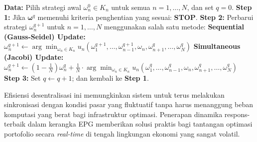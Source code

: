 \begin{algorithm}[htbp]
\caption{Iterative Best Response Algorithm \cite{jain_multi-portfolio_2012}}
\label{alg:best_response}
\begin{algorithmic}[1]
\State \textbf{Data:} Pilih strategi awal $\omega_n^0 \in K_n$ untuk semua $n = 1, \dots, N$, dan set $q = 0$.
\State \textbf{Step 1:} Jika $\mathbf{\omega}^q$ memenuhi kriteria penghentian yang sesuai: \textbf{STOP}.
\State \textbf{Step 2:} Perbarui strategi $\omega_n^{q+1}$ untuk $n = 1, \dots, N$ menggunakan salah satu metode:
    \State \quad \textbf{Sequential (Gauss-Seidel) Update:}
    \State \quad $\omega_n^{q+1} \leftarrow \arg \min_{\omega_n \in K_n} u_n(\omega_1^{q+1}, \dots, \omega_{n-1}^{q+1}, \omega_n, \omega_{n+1}^q, \dots, \omega_N^q)$
    \State \quad \textbf{Simultaneous (Jacobi) Update:}
    \State \quad $\omega_n^{q+1} \leftarrow (1 - \frac{1}{N})\omega_n^q + \frac{1}{N} \cdot \arg \min_{\omega_n \in K_n} u_n(\omega_1^q, \dots, \omega_{n-1}^q, \omega_n, \omega_{n+1}^q, \dots, \omega_N^q)$
\State \textbf{Step 3:} Set $q \leftarrow q + 1$; dan kembali ke \textbf{Step 1}.
\end{algorithmic}
\end{algorithm}

Efisiensi desentralisasi ini memungkinkan sistem untuk terus melakukan sinkronisasi dengan kondisi pasar yang fluktuatif tanpa harus menanggung beban komputasi yang berat bagi infrastruktur optimasi. Penerapan dinamika respons-terbaik dalam kerangka EPG memberikan solusi praktis bagi tantangan optimasi portofolio secara \textit{real-time} di tengah lingkungan ekonomi yang sangat volatil.

